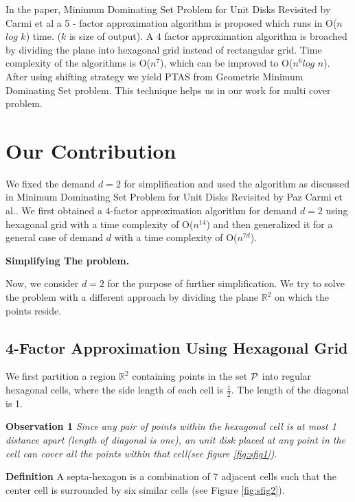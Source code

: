 \documentclass[a4paper,10pt]{article}  %
\begin{document}
		
	In the paper, Minimum Dominating Set Problem for Unit Disks Revisited by Carmi et al \cite{CarmiDJNPS15} a 5 - factor approximation algorithm is proposed which runs in O($n$ $log$ $k$) time. ($k$ is size of output). A $4$ factor approximation algorithm is broached by dividing the plane into hexagonal grid instead of rectangular grid. Time complexity of the algorithms is O($n^7$), which can be improved to O($n^6log$ $n$). After using shifting strategy we yield PTAS from Geometric Minimum Dominating Set problem\cite{DeDCN13}. This technique helps us in  our work for multi cover problem.
	
	
	\section{Our Contribution}
	
	 We fixed the demand $d = 2$ for simplification and used the algorithm as discussed in Minimum Dominating Set Problem for Unit Disks Revisited by Paz Carmi et al.\cite{CarmiDJNPS15}. We first obtained a $4$-factor approximation algorithm for demand $d=2$ using hexagonal grid with a time complexity of O($n^{14}$) and then generalized it for a general case of demand $d$ with a time complexity of O($n^{7d}$).
	
	
	\textbf{Simplifying The problem.}
	
	Now, we consider $d = 2$ for the purpose of further simplification. We try to solve the problem with a different approach by dividing the plane $\mathbb{R}^2$ on which the points reside. 
	
	\subsection{4-Factor Approximation Using Hexagonal Grid}
	We first partition a region $\mathbb{R}^2$ containing points in the set ${\cal P}$ into regular hexagonal cells, where the side length of each cell is $\frac{1}{2}$. The length of the diagonal is 1.
	
	\textbf{Observation 1} \textit{Since any pair of points within the hexagonal cell is at most 1 distance apart (length of diagonal is one), an unit disk placed at any point in the cell can cover all the points within that cell(see figure \ref{fig:sfig1})}.
	
	\textbf{Definition} A septa-hexagon is a combination of 7 adjacent cells such that the center cell is surrounded by six similar cells (see Figure \ref{fig:sfig2}).
	
\end{document}
